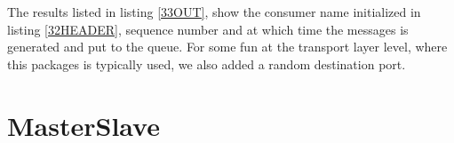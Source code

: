 \documentclass[a4paper,12pt]{report}    %
\begin{document}


The results listed in listing \ref{33OUT}, show the consumer name initialized in listing \ref{32HEADER}, sequence number and at which time the messages is generated and put to the queue. For some fun at the transport layer level, where this packages is typically used, we also added a random destination port.

\lstset{style=output}






\section{MasterSlave}
\end{document}
